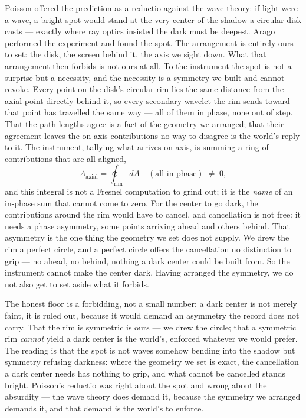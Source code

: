Poisson offered the prediction as a reductio against the wave theory: if light were a wave, a bright spot
would stand at the very center of the shadow a circular disk casts --- exactly where ray optics insisted the
dark must be deepest. Arago performed the experiment and found the spot. The arrangement is entirely ours to
set: the disk, the screen behind it, the axis we sight down. What that arrangement then forbids is not ours at
all. To the instrument the spot is not a surprise but a necessity, and the necessity is a symmetry we built and
cannot revoke. Every point on the disk's circular rim lies the same distance from the axial point directly
behind it, so every secondary wavelet the rim sends toward that point has travelled the same way --- all of
them in phase, none out of step. That the path-lengths agree is a fact of the geometry we arranged; that their
agreement leaves the on-axis contributions no way to disagree is the world's reply to it. The instrument,
tallying what arrives on axis, is summing a ring of contributions that are all aligned,
\begin{equation}
  A_{\mathrm{axial}} = \oint_{\mathrm{rim}} dA \quad (\text{all in phase}) \;\neq\; 0,
\end{equation}
and this integral is not a Fresnel computation to grind out; it is the \emph{name} of an in-phase sum that
cannot come to zero. For the center to go dark, the contributions around the rim would have to cancel, and
cancellation is not free: it needs a phase asymmetry, some points arriving ahead and others behind. That
asymmetry is the one thing the geometry we set does not supply. We drew the rim a perfect circle, and a perfect
circle offers the cancellation no distinction to grip --- no ahead, no behind, nothing a dark center could be
built from. So the instrument cannot make the center dark. Having arranged the symmetry, we do not also get to
set aside what it forbids.

The honest floor is a forbidding, not a small number: a dark center is not merely faint, it is ruled out,
because it would demand an asymmetry the record does not carry. That the rim is symmetric is ours --- we drew
the circle; that a symmetric rim \emph{cannot} yield a dark center is the world's, enforced whatever we would
prefer. The reading is that the spot is not waves somehow bending into the shadow but symmetry refusing
darkness: where the geometry we set is exact, the cancellation a dark center needs has nothing to grip, and
what cannot be cancelled stands bright. Poisson's reductio was right about the spot and wrong about the
absurdity --- the wave theory does demand it, because the symmetry we arranged demands it, and that demand is
the world's to enforce.

